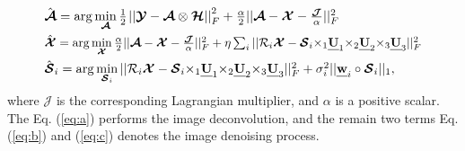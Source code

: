 \documentclass[twocolumn]{svjour3}          %
\begin{document}
    \begin{subequations}\label{eq:deblurring-WLRTR-ADMM}
    \begin{align}
    \setlength{\abovedisplayskip}{2pt}
    \setlength{\belowdisplayskip}{2pt}
    \label{eq:a}
    &\resizebox{0.68\hsize}{!}{${\hat {\boldsymbol{\mathcal{A}}} = \arg \mathop {\min }\limits_{\boldsymbol{\mathcal{A}}} \frac{1}{2}{\kern 1pt} {\rm{||}}{\boldsymbol{\mathcal{Y}}} - {\boldsymbol{\mathcal{A}}} \otimes {\boldsymbol{\mathcal{H}}}{\rm{||}}_F^2 + \frac{\alpha }{2}||{\boldsymbol{\mathcal{A}}} - {\boldsymbol{\mathcal{X}}} - \frac{\boldsymbol{\mathcal{J}}}{\alpha }||_F^2}$}\\
    \label{eq:b}
    &\resizebox{0.87\hsize}{!}{${\hat {\boldsymbol{\mathcal{X}}} = \arg \mathop {\min }\limits_{\boldsymbol{\mathcal{X}}} \frac{\alpha }{2}||{\boldsymbol{\mathcal{A}}} - {\boldsymbol{\mathcal{X}}} - \frac{\boldsymbol{\mathcal{J}}}{\alpha }||_F^2 + \eta \sum\nolimits_i {||{{\mathcal{R}}_i}{\boldsymbol{\mathcal{X}}} - {{\boldsymbol{\mathcal{S}}}_i}{ \times _1}{\textbf{\emph{U}}_1}{ \times _2}{\textbf{\emph{U}}_2}{ \times _3}{\textbf{\emph{U}}_3}||_F^2} }$}\\
    \label{eq:c}
    &\resizebox{0.8\hsize}{!}{${{{\hat {\boldsymbol{\mathcal{S}}}}_i} = \arg \mathop {\min }\limits_{{{\boldsymbol{\mathcal{S}}}_i}} ||{{\mathcal{R}}_i}{\boldsymbol{\mathcal{X}}} - {{\boldsymbol{\mathcal{S}}}_i}{ \times _1}{\textbf{\emph{U}}_1}{ \times _2}{\textbf{\emph{U}}_2}{ \times _3}{\textbf{\emph{U}}_3}||_F^2 + \sigma _i^2||{\textbf{\emph{w}}_i} \circ {{\boldsymbol{\mathcal{S}}}_i}|{|_1}}$},
    \end{align}
    \end{subequations}
    where ${\boldsymbol{\mathcal{J}}}$ is the corresponding Lagrangian multiplier, and $\alpha$ is a positive scalar. The Eq. (\ref{eq:a}) performs the image deconvolution, and the remain two terms Eq. (\ref{eq:b}) and (\ref{eq:c}) denotes the image denoising process.
\end{document}
